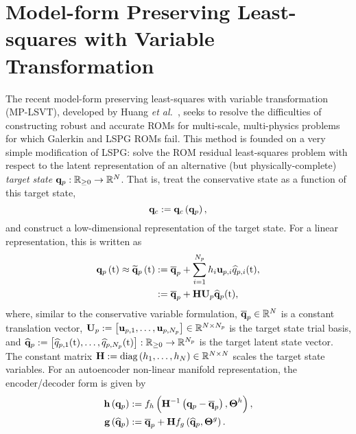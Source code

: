 \section{Model-form Preserving Least-squares with Variable Transformation}\label{sec:mplsvt}

The recent model-form preserving least-squares with variable transformation (MP-LSVT), developed by Huang \textit{et al.}~\cite{Huang2022}, seeks to resolve the difficulties of constructing robust and accurate ROMs for multi-scale, multi-physics problems for which Galerkin and LSPG ROMs fail. This method is founded on a very simple modification of LSPG: solve the ROM residual least-squares problem with respect to the latent representation of an alternative (but physically-complete) \textit{target state} $\mathbf{q}_{p}: \mathbb{R}_{\ge 0} \rightarrow \mathbb{R}^{N}$. That is, treat the conservative state as a function of this target state,
%
\begin{equation}\label{eq:consFuncTarget}
    \mathbf{q}_{c} := \mathbf{q}_{c} \left(\mathbf{q}_{p}\right),
\end{equation}
%
and construct a low-dimensional representation of the target state. For a linear representation, this is written as
%
\begin{equation}\label{eq:primSolApprox}
    \begin{aligned}
        \primFunc{\timeVar} \approx \primFuncRom{\timeVar} &\defEq \primVecCent + \sum_{\dummyIdx=1}^{\numPrimModes} \primScaleVar_\dummyIdx \primTrialVecIdx \primVarCoefIdx (\timeVar), \\
        &\defEq \primAffineMap(\timeVar),
    \end{aligned}
\end{equation}
%
where, similar to the conservative variable formulation, $\mathbf{\overline{q}}_{p} \in \mathbb{R}^{N}$ is a constant translation vector, $\primTrial \defEq \left[\primTrialVec{1},\hdots,\primTrialVec{\numPrimModes}\right] \inRTwo{\numDOF}{\numPrimModes}$ is the target state trial basis, and $\mathbf{\widehat{q}}_{p} := \left[\widehat{q}_{p,1}(\text{t}),\hdots,\widehat{q}_{p,N_p}(\text{t})\right]: \mathbb{R}_{\ge 0} \rightarrow \mathbb{R}^{N_p}$ is the target latent state vector. The constant matrix $\primScale \defEq \text{diag}\left(\primScaleVar_1, \hdots , \primScaleVar_{\numDOF}\right) \inRTwo{\numDOF}{\numDOF}$ scales the target state variables. For an autoencoder non-linear manifold representation, the encoder/decoder form is given by 
%
\begin{align}
    \encoderFunc{\primVec} &\defEq \nnLayer_{\encoderVar} \left(\primScaleInv\left(\primVec - \primVecCent\right), \nnParams^{\encoderVar}\right), \\
    \decoderFunc{\primVecCoef} &\defEq \primVecCent + \primScale \nnLayer_{\decoderVar} \left(\primVecCoef, \nnParams^{\decoderVar}\right). \label{eq:decoderFuncPrim}
\end{align}
